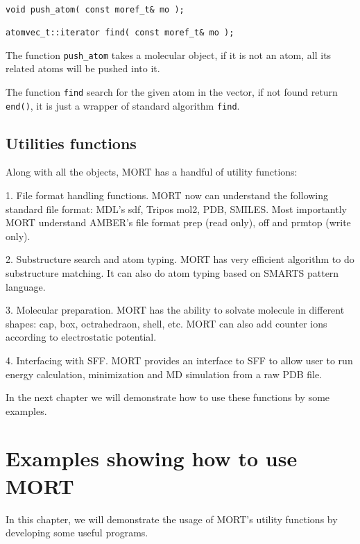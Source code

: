 \documentclass[letterpaper]{book}
\begin{document}
\begin{lstlisting}

void push_atom( const moref_t& mo );

atomvec_t::iterator find( const moref_t& mo );

\end{lstlisting}

The function \lstinline$push_atom$ takes a molecular object, if it is not an atom, all its related atoms
will be pushed into it.

The function \lstinline$find$ search for the given atom in the vector, if not found return \lstinline$end()$,
it is just a wrapper of standard algorithm \lstinline$find$.


  


\section{Utilities functions}

   Along with all the objects, MORT has a handful of utility functions:
   

   1.  File format handling functions.  MORT now can understand the following standard file format: 
MDL's sdf, Tripos mol2, PDB, SMILES. Most importantly MORT understand  AMBER's file format
prep (read only), off and prmtop (write only).

   2. Substructure search and atom typing. MORT has very efficient algorithm to do substructure 
matching. It can also do atom typing based on SMARTS pattern language.

   3. Molecular preparation. MORT has the ability to solvate molecule in different shapes: cap,
box, octrahedraon, shell, etc. MORT can also add counter ions according to electrostatic 
potential. 

   4. Interfacing with SFF. MORT provides an interface to SFF to allow user to run energy calculation,
   minimization and MD simulation from a raw PDB file.   

   In the next chapter we will demonstrate how to use these functions by some examples.

\chapter{Examples showing how to use MORT}

  In this chapter, we will demonstrate the usage of MORT's utility functions by developing 
  some useful programs.
\end{document}
